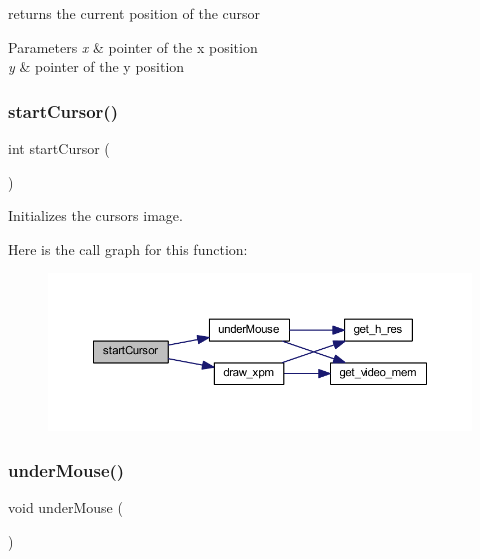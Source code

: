 returns the current position of the cursor 


\begin{DoxyParams}{Parameters}
{\em x} & pointer of the x position \\
\hline
{\em y} & pointer of the y position \\
\hline
\end{DoxyParams}
\mbox{\label{group__cursor_ga832ef8a00055d81e9bbba145f018eefe}} 
\subsubsection{\texorpdfstring{startCursor()}{startCursor()}}
{\footnotesize\ttfamily int start\+Cursor (\begin{DoxyParamCaption}{ }\end{DoxyParamCaption})}



Initializes the cursors image. 

Here is the call graph for this function\+:
\nopagebreak
\begin{figure}[H]
\begin{center}
\leavevmode
\includegraphics[width=350pt]{group__cursor_ga832ef8a00055d81e9bbba145f018eefe_cgraph}
\end{center}
\end{figure}
\mbox{\label{group__cursor_ga10ade0aba9d682a7f9fa64c65ef3a8e3}} 
\subsubsection{\texorpdfstring{underMouse()}{underMouse()}}
{\footnotesize\ttfamily void under\+Mouse (\begin{DoxyParamCaption}{ }\end{DoxyParamCaption})}



